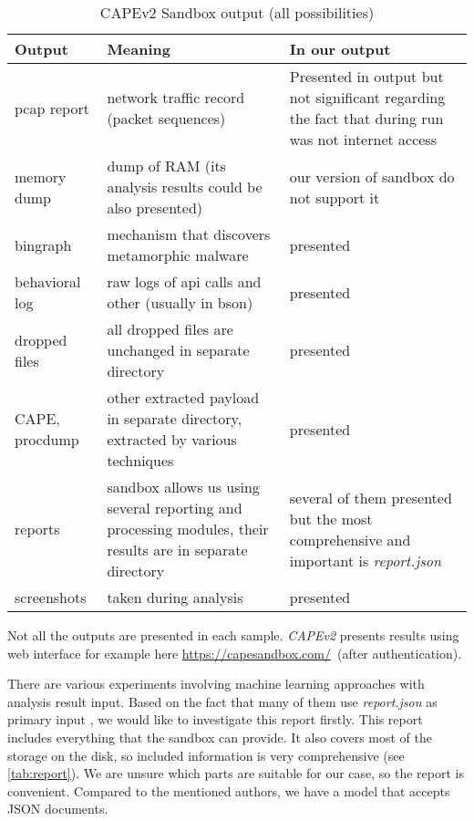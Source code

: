 \begin{table}[h]
    \centering
    \caption{CAPEv2 Sandbox output (all possibilities)}
    \begin{tabular}{p{2cm}p{6cm}p{6cm}} 
        \toprule
        \textbf{Output} &
        \textbf{Meaning} &
        \textbf{In our output} \\
        \midrule
        pcap report & network traffic record (packet sequences) & Presented in output but not significant regarding the fact that during run was not internet access \\
        \midrule
        memory dump & dump of RAM (its analysis results could be also presented)& our version of sandbox do not support it \\
        \midrule
        bingraph & mechanism that discovers metamorphic malware \cite{Kwon2012}& presented\\
        \midrule
        behavioral log & raw logs of api calls and other (usually in bson) & presented \\
        \midrule
        dropped files & all dropped files are unchanged in separate directory & presented \\
        \midrule
        CAPE, procdump & other extracted payload in separate directory, extracted by various techniques \cite{Cape} & presented \\
        \midrule
        reports & sandbox allows us using several reporting and processing modules, their results are in separate directory  & several of them presented but the most comprehensive and important is \emph{report.json} \\
        \midrule
        screenshots & taken during analysis  & presented \\
        \bottomrule
    \end{tabular}
    \label{tab:sandbox-out}
\end{table}

Not all the outputs are presented in each sample. \emph{CAPEv2} presents results using web interface for example here \url{https://capesandbox.com/}~(after authentication).

There are various experiments involving machine learning approaches with analysis result input. Based on the fact that many of them use \emph{report.json} as primary input \cite{Darshan2016, Dinh2019a, Kim2020, Sethi2019}, we would like to investigate this report firstly. This report includes everything that the sandbox can provide. It also covers most of the storage on the disk, so included information is very comprehensive (see \ref{tab:report}). We are unsure which parts are suitable for our case, so the report is convenient. Compared to the mentioned authors, we have a model that accepts JSON documents.

